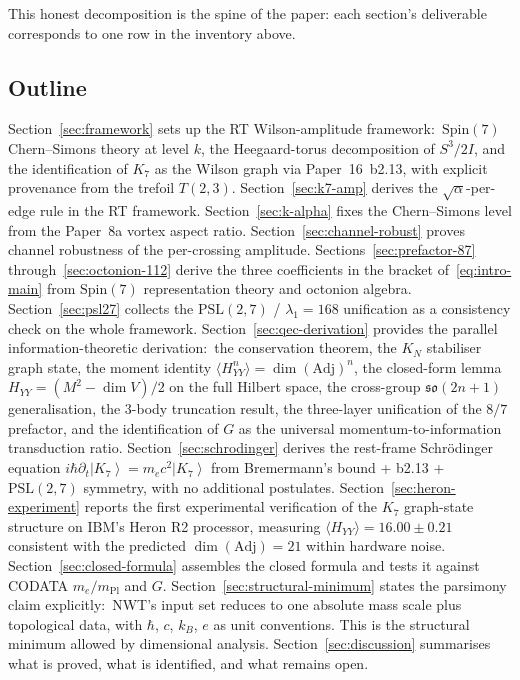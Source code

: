\documentclass[11pt]{article}
\newcommand{\so}{\mathfrak{so}}
\newcommand{\Spin}{\mathrm{Spin}}
\newcommand{\Adj}{\mathrm{Adj}}
\newcommand{\ket}[1]{\left|#1\right\rangle}
\newcommand{\mPl}{m_{\mathrm{Pl}}}
\newcommand{\PSL}{\mathrm{PSL}}
\begin{document}
\noindent
This honest decomposition is the spine of the paper: each
section's deliverable corresponds to one row in the inventory
above.

\subsection{Outline}
\label{sec:intro-outline}

Section~\ref{sec:framework} sets up the RT Wilson-amplitude
framework:\ $\Spin(7)$ Chern--Simons theory at level $k$, the
Heegaard-torus decomposition of $S^3/2I$, and the identification
of $K_7$ as the Wilson graph via Paper~16~b2.13, with explicit
provenance from the trefoil $T(2,3)$.
Section~\ref{sec:k7-amp} derives the $\sqrt{\alpha}$-per-edge rule
in the RT framework.  Section~\ref{sec:k-alpha} fixes the
Chern--Simons level from the Paper~8a vortex aspect ratio.
Section~\ref{sec:channel-robust} proves channel robustness of the
per-crossing amplitude.  Sections~\ref{sec:prefactor-87}
through~\ref{sec:octonion-112} derive the three coefficients in
the bracket of~\eqref{eq:intro-main} from $\Spin(7)$ representation
theory and octonion algebra.
Section~\ref{sec:psl27} collects the $\mathrm{PSL}(2,7)$ /
$\lambda_1 = 168$ unification as a consistency check on the whole
framework.
Section~\ref{sec:qec-derivation} provides the parallel
information-theoretic derivation:\ the conservation theorem,
the $K_N$ stabiliser graph state, the moment identity
$\langle H_{YY}^n\rangle = \dim(\Adj)^n$, the closed-form lemma
$H_{YY} = (M^2 - \dim V)/2$ on the full Hilbert space, the
cross-group $\so(2n+1)$ generalisation, the 3-body truncation
result, the three-layer unification of the $8/7$ prefactor, and
the identification of $G$ as the universal momentum-to-information
transduction ratio.
Section~\ref{sec:schrodinger} derives the rest-frame Schr\"odinger
equation $i\hbar \partial_t \ket{K_7} = m_e c^2 \ket{K_7}$ from
Bremermann's bound + b2.13 + $\PSL(2,7)$ symmetry, with no
additional postulates.
Section~\ref{sec:heron-experiment} reports the first experimental
verification of the $K_7$ graph-state structure on IBM's Heron R2
processor, measuring $\langle H_{YY}\rangle = 16.00 \pm 0.21$
consistent with the predicted $\dim(\Adj) = 21$ within hardware
noise.  Section~\ref{sec:closed-formula} assembles the closed
formula and tests it against CODATA $m_e/\mPl$ and $G$.
Section~\ref{sec:structural-minimum} states the parsimony claim
explicitly:\ NWT's input set reduces to one absolute mass scale
plus topological data, with $\hbar$, $c$, $k_B$, $e$ as unit
conventions.  This is the structural minimum allowed by dimensional
analysis.
Section~\ref{sec:discussion} summarises what is proved, what is
identified, and what remains open.
\end{document}
